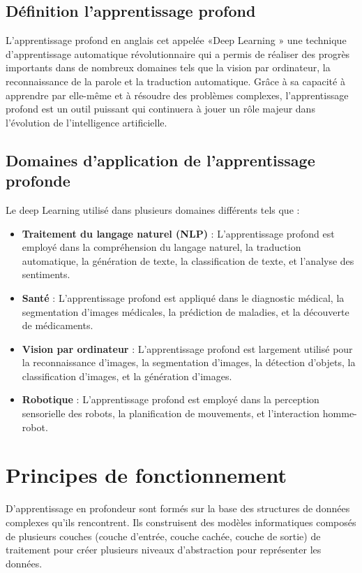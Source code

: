 \subsection{Définition l'apprentissage profond}
L’apprentissage profond en anglais cet appelée «Deep Learning » une technique d'apprentissage automatique révolutionnaire qui a permis de réaliser des progrès importants dans de nombreux domaines tels que la vision par ordinateur, la reconnaissance de la parole et la traduction automatique. 
Grâce à sa capacité à apprendre par elle-même et à résoudre des problèmes complexes, l'apprentissage profond est un outil puissant qui continuera à jouer un rôle majeur dans l'évolution de l'intelligence artificielle. 

\subsection{Domaines d'application de l'apprentissage profonde }
Le deep Learning utilisé dans plusieurs domaines différents tels que :

\begin{itemize}
\item  \textbf{Traitement du langage naturel (NLP)} : L'apprentissage profond est employé dans la compréhension du langage naturel, la traduction automatique, la génération de texte, la classification de texte, et l'analyse des sentiments.

\item \textbf{Santé} : L'apprentissage profond est appliqué dans le diagnostic médical, la segmentation d'images médicales, la prédiction de maladies, et la découverte de médicaments.

\item \textbf{Vision par ordinateur} : L'apprentissage profond est largement utilisé pour la reconnaissance d'images, la segmentation d'images, la détection d'objets, la classification d'images, et la génération d'images.

\item \textbf{Robotique} : L'apprentissage profond est employé dans la perception sensorielle des robots, la planification de mouvements, et l'interaction homme-robot.
\end{itemize}

 \section{Principes de fonctionnement }
 D’apprentissage en profondeur sont formés sur la base des structures de données complexes qu'ils rencontrent. 
Ils construisent des modèles informatiques composés de plusieurs couches (couche d'entrée, couche cachée, couche de sortie) de traitement pour créer plusieurs niveaux d'abstraction pour représenter les données. 

